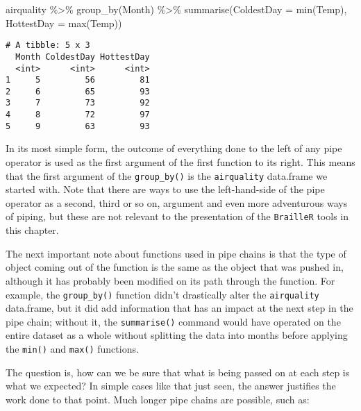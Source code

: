 \documentclass[
]{book}
\newenvironment{Shaded}{\begin{snugshade}}{\end{snugshade}}
\newcommand{\AttributeTok}[1]{\textcolor[rgb]{0.77,0.63,0.00}{#1}}
\newcommand{\FunctionTok}[1]{\textcolor[rgb]{0.00,0.00,0.00}{#1}}
\newcommand{\NormalTok}[1]{#1}
\newcommand{\SpecialCharTok}[1]{\textcolor[rgb]{0.00,0.00,0.00}{#1}}
\begin{document}
\begin{Shaded}
\begin{Highlighting}[]
\NormalTok{airquality }\SpecialCharTok{\%\textgreater{}\%} \FunctionTok{group\_by}\NormalTok{(Month) }\SpecialCharTok{\%\textgreater{}\%} \FunctionTok{summarise}\NormalTok{(}\AttributeTok{ColdestDay =} \FunctionTok{min}\NormalTok{(Temp), }\AttributeTok{HottestDay =} \FunctionTok{max}\NormalTok{(Temp))}
\end{Highlighting}
\end{Shaded}

\begin{verbatim}
# A tibble: 5 x 3
  Month ColdestDay HottestDay
  <int>      <int>      <int>
1     5         56         81
2     6         65         93
3     7         73         92
4     8         72         97
5     9         63         93
\end{verbatim}

In its most simple form, the outcome of everything done to the left of any pipe operator is used as the first argument of the first function to its right. This means that the first argument of the \texttt{group\_by()} is the \texttt{airquality} data.frame we started with. Note that there are ways to use the left-hand-side of the pipe operator as a second, third or so on, argument and even more adventurous ways of piping, but these are not relevant to the presentation of the \texttt{BrailleR} tools in this chapter.

The next important note about functions used in pipe chains is that the type of object coming out of the function is the same as the object that was pushed in, although it has probably been modified on its path through the function. For example, the \texttt{group\_by()} function didn't drastically alter the \texttt{airquality} data.frame, but it did add information that has an impact at the next step in the pipe chain; without it, the \texttt{summarise()} command would have operated on the entire dataset as a whole without splitting the data into months before applying the \texttt{min()} and \texttt{max()} functions.

The question is, how can we be sure that what is being passed on at each step is what we expected? In simple cases like that just seen, the answer justifies the work done to that point. Much longer pipe chains are possible, such as:
\end{document}
